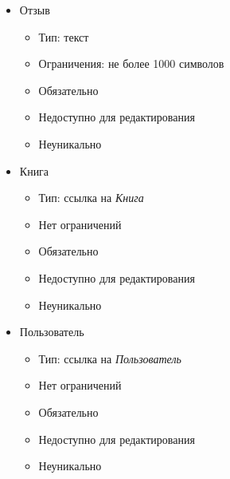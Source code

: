 \documentclass[data-specification.tex]{subfiles}
\begin{document}
\begin{itemize}
    \item Отзыв
    \begin{itemize}
        \item Тип: текст
        \item Ограничения: не более 1000 символов
        \item Обязательно
        \item Недоступно для редактирования
        \item Неуникально
    \end{itemize}
    \item Книга
    \begin{itemize}
        \item Тип: ссылка на \textsl{Книга}
        \item Нет ограничений
        \item Обязательно
        \item Недоступно для редактирования
        \item Неуникально
    \end{itemize}
    \item Пользователь
    \begin{itemize}
        \item Тип: ссылка на \textsl{Пользователь}
        \item Нет ограничений
        \item Обязательно
        \item Недоступно для редактирования
        \item Неуникально
    \end{itemize}
\end{itemize}
\clearpage
\end{document}
